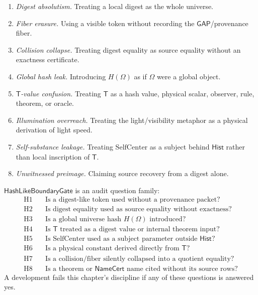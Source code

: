 \begin{enumerate}
\item \emph{Digest absolutism.} Treating a local digest as the whole universe.
\item \emph{Fiber erasure.} Using a visible token without recording the $\mathsf{GAP}$/provenance fiber.
\item \emph{Collision collapse.} Treating digest equality as source equality without an exactness certificate.
\item \emph{Global hash leak.} Introducing $H(\Omega)$ as if $\Omega$ were a global object.
\item \emph{$\mathsf{T}$-value confusion.} Treating $\mathsf{T}$ as a hash value, physical scalar, observer, rule, theorem, or oracle.
\item \emph{Illumination overreach.} Treating the light/visibility metaphor as a physical derivation of light speed.
\item \emph{Self-substance leakage.} Treating $\mathrm{SelfCenter}$ as a subject behind $\mathsf{Hist}$ rather than local inscription of $\mathsf{T}$.
\item \emph{Unwitnessed preimage.} Claiming source recovery from a digest alone.
\end{enumerate}

\begin{definition}[HashLikeBoundaryGate]
\label{def:hash-like-boundary-gate}
$\mathsf{HashLikeBoundaryGate}$ is an audit question family:
$$
\begin{aligned}
\mathrm{H1} &\quad \text{Is a digest-like token used without a provenance packet?} \\
\mathrm{H2} &\quad \text{Is digest equality used as source equality without exactness?} \\
\mathrm{H3} &\quad \text{Is a global universe hash } H(\Omega) \text{ introduced?} \\
\mathrm{H4} &\quad \text{Is } \mathsf{T} \text{ treated as a digest value or internal theorem input?} \\
\mathrm{H5} &\quad \text{Is } \mathrm{SelfCenter} \text{ used as a subject parameter outside } \mathsf{Hist}? \\
\mathrm{H6} &\quad \text{Is a physical constant derived directly from } \mathsf{T}? \\
\mathrm{H7} &\quad \text{Is a collision/fiber silently collapsed into a quotient equality?} \\
\mathrm{H8} &\quad \text{Is a theorem or } \mathsf{NameCert} \text{ name cited without its source rows?}
\end{aligned}
$$
A development fails this chapter's discipline if any of these questions is answered yes.
\end{definition}

